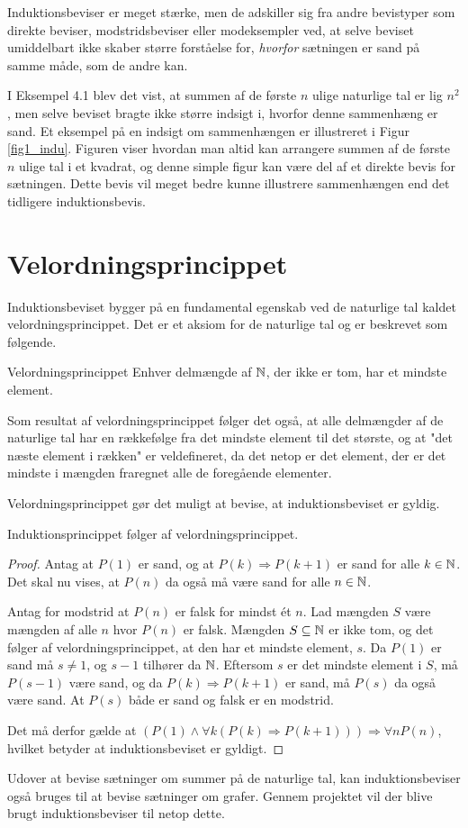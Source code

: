Induktionsbeviser er meget stærke, men de adskiller sig fra andre bevistyper som direkte beviser, modstridsbeviser eller modeksempler ved, at selve beviset umiddelbart ikke skaber større forståelse for, \textit{hvorfor} sætningen er sand på samme måde, som de andre kan.

I Eksempel 4.1 blev det vist, at summen af de første $n$ ulige naturlige tal er lig $n^2$, men selve beviset bragte ikke større indsigt i, hvorfor denne sammenhæng er sand.
Et eksempel på en indsigt om sammenhængen er illustreret i  Figur \ref{fig1_indu}.
Figuren viser hvordan man altid kan arrangere summen af de første $n$ ulige tal i et kvadrat, og denne simple figur kan være del af et direkte bevis for sætningen.
Dette bevis vil meget bedre kunne illustrere sammenhængen end det tidligere induktionsbevis.

\section{Velordningsprincippet}
Induktionsbeviset bygger på en fundamental egenskab ved de naturlige tal kaldet velordningsprincippet.
Det er et aksiom for de naturlige tal og er beskrevet som følgende.
\begin{theorembox}{Velordningsprincippet}
	Enhver delmængde af $\mathbb{N}$, der ikke er tom, har et mindste element.
\end{theorembox}
\noindent Som resultat af velordningsprincippet følger det også, at alle delmængder af de naturlige tal har en rækkefølge fra det mindste element til det største, og at "det næste element i rækken" er veldefineret, da det netop er det element, der er det mindste i mængden fraregnet alle de foregående elementer.

Velordningsprincippet gør det muligt at bevise, at induktionsbeviset er gyldig.

\begin{thm}
	Induktionsprincippet følger af velordningsprincippet.
\end{thm}

\begin{proof}
	Antag at $P(1)$ er sand, og at $P(k) \Rightarrow P(k + 1)$ er sand for alle $k \in \mathbb{N}$.
	Det skal nu vises, at $P(n)$ da også må være sand for alle $n \in \mathbb{N}$.

	Antag for modstrid at $P(n)$ er falsk for mindst ét $n$.
	Lad mængden $S$ være mængden af alle $n$ hvor $P(n)$ er falsk.
	Mængden $S \subseteq \mathbb{N}$ er ikke tom, og det følger af velordningsprincippet, at den har et mindste element, $s$.
	Da $P(1)$ er sand må $s \neq 1$, og $s - 1$ tilhører da $\mathbb{N}$.
	Eftersom $s$ er det mindste element i $S$, må $P(s - 1)$ være sand, og da $P(k) \Rightarrow P(k+1)$ er sand, må $P(s)$ da også være sand.
	At $P(s)$ både er sand og falsk er en modstrid.

	Det må derfor gælde at $(P(1) \land \forall k ( P(k) \Rightarrow P(k + 1))) \Rightarrow \forall n P(n)$, hvilket betyder at induktionsbeviset er gyldigt.
\end{proof}

Udover at bevise sætninger om summer på de naturlige tal, kan induktionsbeviser også bruges til at bevise sætninger om grafer.
Gennem projektet vil der blive brugt induktionsbeviser til netop dette.
